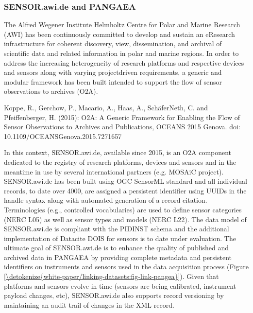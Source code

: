 \documentclass[a4paper,10pt,english]{sphinxmanual}
\begin{document}
\subsubsection{SENSOR.awi.de and PANGAEA}
\label{\detokenize{white-paper/adoption:sensor-awi-de-and-pangaea}}
\sphinxAtStartPar
The Alfred Wegener Institute Helmholtz Centre for Polar and Marine
Research (AWI) has been continuously committed to develop and sustain
an eResearch infrastructure for coherent discovery, view,
dissemination, and archival of scientific data and related information
in polar and marine regions.  In order to address the increasing
heterogeneity of research platforms and respective devices and sensors
along with varying project\sphinxhyphen{}driven requirements, a generic and modular
framework has been built intended to support the flow of sensor
observations to archives (O2A).%
\begin{footnote}[5]\sphinxAtStartFootnote
Koppe, R., Gerchow, P., Macario, A., Haas, A., Schäfer\sphinxhyphen{}Neth, C.
and Pfeiffenberger, H. (2015): O2A: A Generic Framework for Enabling
the Flow of Sensor Observations to Archives and Publications, OCEANS
2015 Genova. doi: 10.1109/OCEANS\sphinxhyphen{}Genova.2015.7271657
%
\end{footnote} In this context,
SENSOR.awi.de, available since 2015, is an O2A component dedicated to
the registry of research platforms, devices and sensors and in the
meantime in use by several international partners (e.g. MOSAiC
project).  SENSOR.awi.de has been built using OGC SensorML standard
and all individual records, to date over 4000, are assigned a
persistent identifier using UUIDs in the handle syntax along with
automated generation of a record citation.  Terminologies (e.g.,
controlled vocabularies) are used to define sensor categories (NERC
L05) as well as sensor types and models (NERC L22).  The data model of
SENSOR.awi.de is compliant with the PIDINST schema and the additional
implementation of Datacite DOIS for sensors is to date under
evaluation.  The ultimate goal of SENSOR.awi.de is to enhance the
quality of published and archived data in PANGAEA by providing
complete metadata and persistent identifiers on instruments and
sensors used in the data acquisition process
(\hyperref[\detokenize{white-paper/linking-datasets:fig-link-pangea}]{Figure \ref{\detokenize{white-paper/linking-datasets:fig-link-pangea}}}).  Given that platforms and sensors evolve
in time (sensors are being calibrated, instrument payload changes,
etc), SENSOR.awi.de also supports record versioning by maintaining an
audit trail of changes in the XML record.
\end{document}
